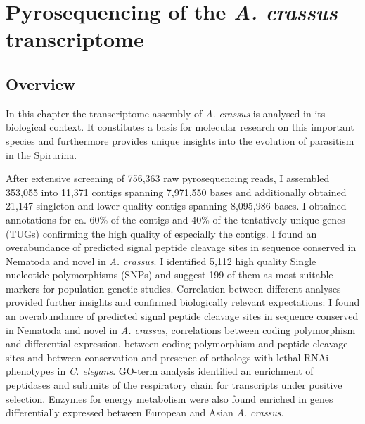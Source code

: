 
\chapter{Pyrosequencing of the \textit{A. crassus}
  transcriptome} %
\label{cha:pyro}



\ifpdf
    \graphicspath{{5_pyro/figures/PNG/}{5_pyro/figures/PDF/}{5_pyro/figures/}}
\else
    \graphicspath{{5_pyro/figures/EPS/}{5_pyro/figures/}}
\fi


\section{Overview}
\label{sec:454-overv}

In this chapter the transcriptome assembly of \textit{A. crassus} is
analysed in its biological context. It constitutes a basis for
molecular research on this important species and furthermore provides
unique insights into the evolution of parasitism in the Spirurina.

After extensive screening of 756,363 raw pyrosequencing reads, I
assembled 353,055 into 11,371 contigs spanning 7,971,550 bases and
additionally obtained 21,147 singleton and lower quality contigs
spanning 8,095,986 bases. I obtained annotations for ca. 60\% of the
contigs and 40\% of the tentatively unique genes (TUGs) confirming the
high quality of especially the contigs. I found an overabundance of
predicted signal peptide cleavage sites in sequence conserved in
Nematoda and novel in \textit{A. crassus}. I identified 5,112 high
quality Single nucleotide polymorphisms (SNPs) and suggest 199 of them
as most suitable markers for population-genetic studies. Correlation
between different analyses provided further insights and confirmed
biologically relevant expectations: I found an overabundance of
predicted signal peptide cleavage sites in sequence conserved in
Nematoda and novel in \textit{A. crassus}, correlations between coding
polymorphism and differential expression, between coding polymorphism
and peptide cleavage sites and between conservation and presence of
orthologs with lethal RNAi-phenotypes in \textit{C. elegans}. GO-term
analysis identified an enrichment of peptidases and subunits of the
respiratory chain for transcripts under positive selection. Enzymes
for energy metabolism were also found enriched in genes differentially
expressed between European and Asian \textit{A. crassus}.

